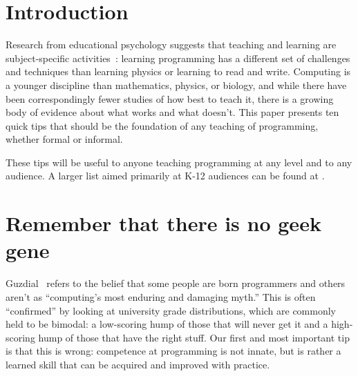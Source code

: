 \documentclass[10pt,letterpaper]{article}
\newcommand{\rulemajor}[2]{\section{#1}\label{#2}}
\newcommand{\evidence}[1]{}
\begin{document}


\section*{Introduction}

Research from educational psychology suggests that teaching and learning are subject-specific
activities~\cite{mayer-subject}: learning programming has a different set of challenges and techniques
than learning physics or learning to read and write.  Computing is a younger discipline than
mathematics, physics, or biology, and while there have been correspondingly fewer studies of how best to teach it,
there is a growing body of evidence about what works and what doesn't.
This paper presents ten quick tips that should be the foundation of any teaching of programming, whether
formal or informal.

These tips will be useful to anyone teaching programming at any level
and to any audience. A larger list aimed primarily at K-12 audiences
can be found at \cite{cs-teaching-tips}.

\rulemajor{Remember that there is no geek gene}{gene}
\evidence{Medium\footnote{Our evidence strength is an informal assessment, factoring in whether the effect has been replicated, and whether it has been shown specifically in computing, or only in other disciplines from which we believe it will transfer.}}

Guzdial~\cite{guzdial-myths} refers to the belief that some people are born programmers and others aren't
as ``computing's most enduring and damaging myth.''
This is often ``confirmed'' by looking at university grade distributions,
which are commonly held to be bimodal:
a low-scoring hump of those that will never get it
and a high-scoring hump of those that have the right stuff.
Our first and most important tip is that this is wrong:
competence at programming is not innate,
but is rather a learned skill that can be acquired and improved with practice.
\end{document}

